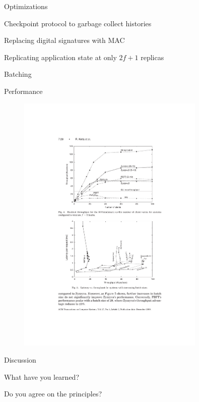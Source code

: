 \begin{frame}{Optimizations}
	
\BIL
\item Checkpoint protocol to garbage collect histories 
\item Replacing digital signatures with MAC
\item Replicating application state at only $2f +1$ replicas
\item Batching
\EIL

\end{frame}

\begin{frame}{Performance}

\begin{figure}
	\includegraphics[width=0.8\textwidth]{figs/17/performance}
\end{figure}

\end{frame}

\begin{frame}{Discussion}

\BIL
\item What have you learned?
\item Do you agree on the principles?
\EIL
\end{frame}


